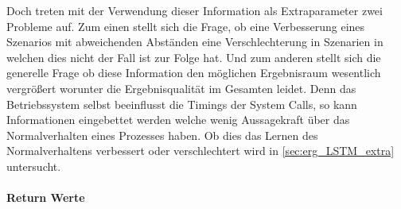                     Doch treten mit der Verwendung dieser Information als Extraparameter zwei Probleme auf.
                    Zum einen stellt sich die Frage, ob eine Verbesserung eines Szenarios mit abweichenden Abständen eine Verschlechterung in Szenarien in welchen dies nicht der Fall ist zur Folge hat.
                    Und zum anderen stellt sich die generelle Frage ob diese Information den möglichen Ergebnisraum wesentlich vergrößert worunter die Ergebnisqualität im Gesamten leidet.
                    Denn das Betriebssystem selbst beeinflusst die Timings der System Calls, so kann Informationen eingebettet werden welche wenig Aussagekraft über das Normalverhalten eines Prozesses haben.
                    Ob dies das Lernen des Normalverhaltens verbessert oder verschlechtert wird in \autoref{sec:erg_LSTM_extra} untersucht.

                \paragraph{Return Werte}

